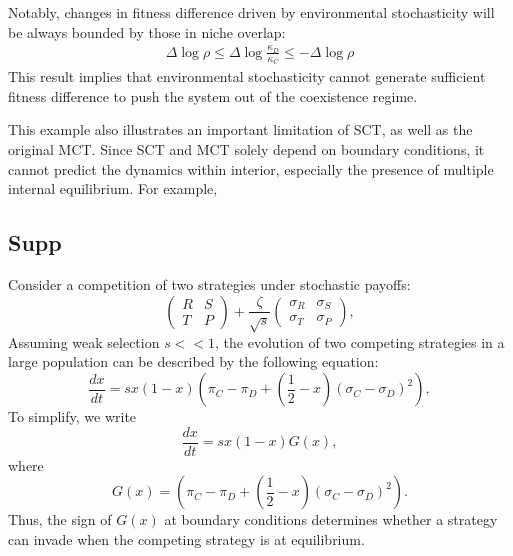 \documentclass[12pt]{article}
\begin{document}
Notably, changes in fitness difference driven by environmental stochasticity will be always bounded by those in niche overlap:
\begin{align}
\Delta \log \rho \leq \Delta \log \frac{\kappa_D}{\kappa_C} \leq - \Delta \log \rho
\end{align}
This result implies that environmental stochasticity cannot generate sufficient fitness difference to push the system out of the coexistence regime.

This example also illustrates an important limitation of SCT, as well as the original MCT.
Since SCT and MCT solely depend on boundary conditions, it cannot predict the dynamics within interior, especially the presence of multiple internal equilibrium.
For example, 

\subsection*{Supp}

Consider a competition of two strategies under stochastic payoffs:
\begin{equation}
\begin{pmatrix}
R & S \\
T & P
\end{pmatrix} +
\frac{\zeta}{\sqrt{s}} \begin{pmatrix}
\sigma_R & \sigma_S \\
\sigma_T & \sigma_P
\end{pmatrix}, 
\end{equation}
Assuming weak selection $s<<1$, the evolution of two competing strategies in a large population can be described by the following equation:
\begin{equation}
\frac{dx}{dt} = s x (1-x) \left(\pi_C - \pi_D + \left(\frac{1}{2} - x \right) (\sigma_C - \sigma_D)^2 \right),
\end{equation}
To simplify, we write
\begin{equation}
\frac{dx}{dt} = s x (1-x) G(x),
\end{equation}
where
\begin{equation}
G(x) = \left(\pi_C - \pi_D + \left(\frac{1}{2} - x \right) (\sigma_C - \sigma_D)^2 \right).
\end{equation}
Thus, the sign of $G(x)$ at boundary conditions determines whether a strategy can invade when the competing strategy is at equilibrium.
\end{document}
